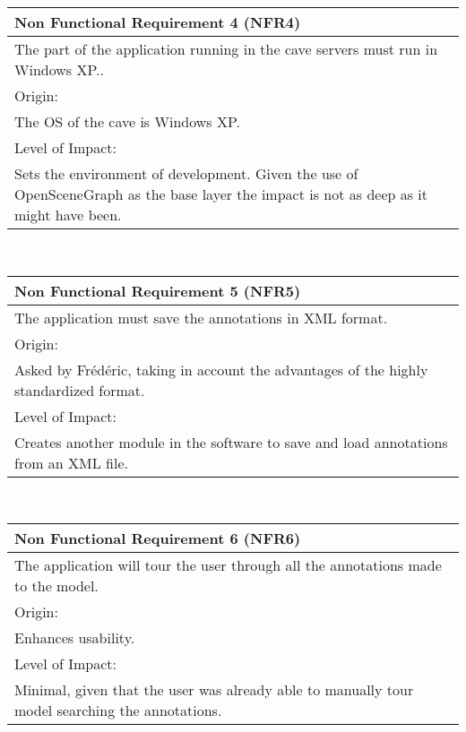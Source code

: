 \begin{center}
\begin{tabular}{p{12.6cm}}
	\hline
	{\Large Non Functional Requirement 4 (NFR4)}\\ \hline \hline
	The part of the application running in the cave servers must run in Windows XP.. \\ \hline
	\large{Origin:}\\ \hline
	The OS of the cave is Windows XP.\\ \hline \hline
	\large{Level of Impact:}\\ \hline
	Sets the environment of development. Given the use of OpenSceneGraph as the base layer the impact is not as deep as it might have been.\\
	\hline
\end{tabular}\\
\vspace{10mm}

\begin{tabular}{p{12.6cm}}
	\hline
	{\Large Non Functional Requirement 5 (NFR5)}\\ \hline \hline
	The application must save the annotations in XML format. \\ \hline
	\large{Origin:}\\ \hline
	Asked by Frédéric, taking in account the advantages of the highly standardized format.\\ \hline \hline
	\large{Level of Impact:}\\ \hline
	Creates another module in the software to save and load annotations from an XML file.\\
	\hline
\end{tabular}\\
\vspace{10mm}

\begin{tabular}{p{12.6cm}}
	\hline
	{\Large Non Functional Requirement 6 (NFR6)}\\ \hline \hline
	The application will tour the user through all the annotations made to the model. \\ \hline
	\large{Origin:}\\ \hline
	Enhances usability.\\ \hline \hline
	\large{Level of Impact:}\\ \hline
	Minimal, given that the user was already able to manually tour model searching the annotations.\\
	\hline
\end{tabular}\\
\vspace{10mm}


\end{center}
